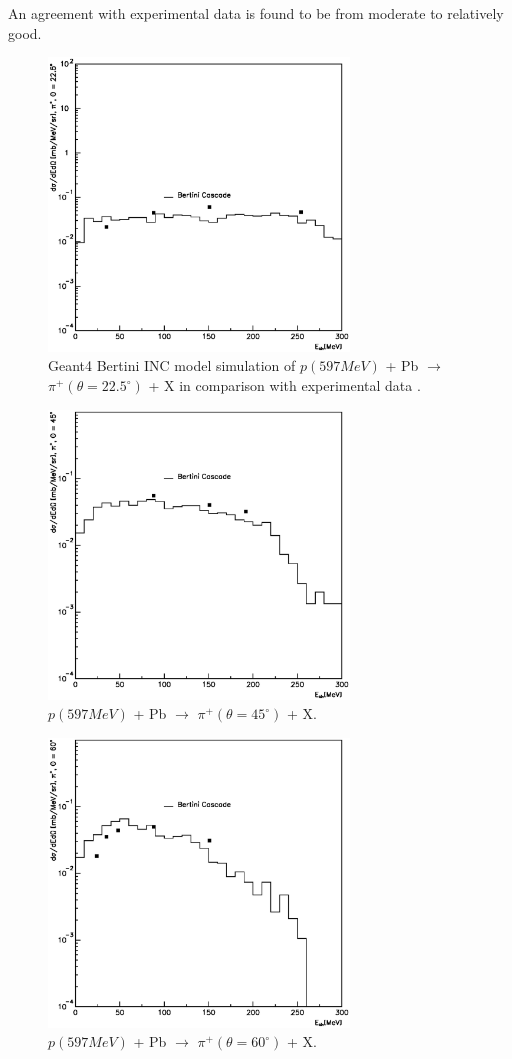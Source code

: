 \documentclass[twocolumn,twoside,slac]{revtex4}
\begin{document}
An agreement with experimental data is found to be from moderate to relatively good.

 
\begin{figure}
  \includegraphics[width=80mm,keepaspectratio]{pn_pb_597_pip_a0.eps}
  \caption{Geant4 Bertini INC model simulation of
$p(597 MeV)$ + Pb $\rightarrow$ $\pi^{+}(\theta = 22.5^{\circ})$ + X
in comparison with experimental data \cite{benchmarkData02}.}
  \label{pi22}
\end{figure}
 

\begin{figure}
  \includegraphics[width=80mm,keepaspectratio]{pn_pb_597_pip_a1.eps}
  \caption{$p(597 MeV)$ + Pb $\rightarrow$ $\pi^{+}(\theta = 45^{\circ})$ + X.}
  \label{pi45}
\end{figure}

\begin{figure}
  \includegraphics[width=80mm,keepaspectratio]{pn_pb_597_pip_a2.eps}
  \caption{$p(597 MeV)$ + Pb $\rightarrow$ $\pi^{+}(\theta = 60^{\circ})$ + X.}
  \label{pi60}
\end{figure}
 
\end{document}
